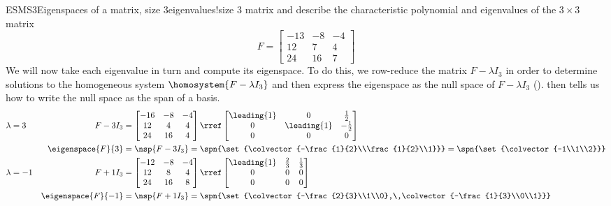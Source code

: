 \begin{example}{ESMS3}{Eigenspaces of a matrix, size 3}{eigenvalues!size 3 matrix}
 and  describe the characteristic polynomial and eigenvalues of the $3\times 3$ matrix
%
\begin{equation*}
F=
\begin{bmatrix}
-13 & -8 & -4\\
12 & 7 & 4\\
24 & 16 & 7
\end{bmatrix}
\end{equation*}
%
We will now take each eigenvalue in turn and compute its eigenspace.  To do this, we row-reduce the matrix
$F-\lambda I_3$ in order to determine solutions to the homogeneous system $\homosystem{F-\lambda I_3}$ and then express the eigenspace as the null space of $F-\lambda I_3$ ().   then tells us how to write the null space as the span of a basis.
%
\begin{align*}
%
\lambda&=3&F-3I_3&=
\begin{bmatrix}
-16 & -8 & -4\\
12 & 4 & 4\\
24 & 16 & 4
\end{bmatrix}
\rref
\begin{bmatrix}
\leading{1} & 0 & \frac{1}{2}\\
0 & \leading{1} & -\frac{1}{2}\\
0 & 0 & 0
\end{bmatrix}\\
&&\eigenspace{F}{3}&=\nsp{F-3I_3}
=\spn{\set{\colvector{-\frac{1}{2}\\\frac{1}{2}\\1}}}
=\spn{\set{\colvector{-1\\1\\2}}}\\
%
\lambda&=-1&F+1I_3&=
\begin{bmatrix}
-12 & -8 & -4\\
12 & 8 & 4\\
24 & 16 & 8
\end{bmatrix}
\rref
\begin{bmatrix}
\leading{1} & \frac{2}{3} & \frac{1}{3}\\
0 & 0 & 0\\
0 & 0 & 0
\end{bmatrix}\\
&&\eigenspace{F}{-1}&=\nsp{F+1I_3}
=\spn{\set{\colvector{-\frac{2}{3}\\1\\0},\,\colvector{-\frac{1}{3}\\0\\1}}}

\end{align*}
\end{example}
